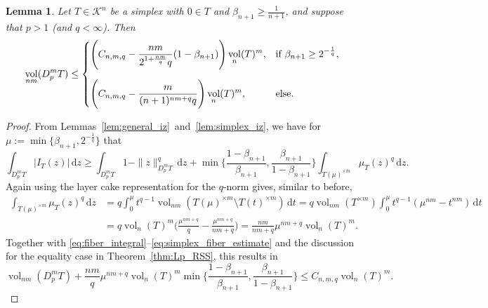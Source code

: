 \documentclass{amsart}
\newtheorem{lemma}[theorem]{Lemma}
\newcommand\CK{\mathcal{K}}
\newcommand{\dd}{\,\mathrm{d}}
\DeclareMathOperator{\vol}{vol}
\newcommand{\diff}[3]{D_{#1}^{#2} #3}
\newcommand{\interval}[4]{I_{#3} (#4)}
\newcommand{\simplexscale}[2]{#1(#2)}
\newcommand{\simplexscaling}[2]{\mu_{#1}(#2)}
\newcommand{\cartesian}[2]{#1^{\times #2}}
\begin{document}
\begin{lemma}\label{lem:simplex_stability}
Let $T \in \CK^n$ be a simplex with $0 \in T$ and $\beta_{n+1} \geq \frac{1}{n+1}$, and suppose that $p > 1$ (and $q < \infty$).
Then
\[
	\vol_{nm}(\diff{p}{m}{T})
	\leq \begin{cases}
		\displaystyle \Bigg( C_{n,m,q} - \frac{nm}{2^{1+\frac{nm}{q}} q} (1-\beta_{n+1}) \Bigg) \vol_n(T)^m,
			& \text{if } \beta_{n+1} \geq 2^{-\frac{1}{q}},
		\vspace{10pt}
		\\
		\displaystyle \Bigg( C_{n,m,q} - \frac{m}{(n+1)^{nm+q} q} \Bigg) \vol_n(T)^m,
			& \text{else}.
	\end{cases}
\]
\end{lemma}
\begin{proof}
From Lemmas~\ref{lem:general_iz}~and~\ref{lem:simplex_iz}, we have for $\mu := \min \{ \beta_{n+1}, 2^{-\frac{1}{q}} \}$ that
\begin{equation}\label{eq:simplex_fiber_estimate}
	\int_{\diff{p}{m}{T}} |\interval{p}{m}{T}{z}| \dd z
	\geq \int_{\diff{p}{m}{T}} 1 - \|z\|_{\diff{p}{m}{T}}^q \dd z
		+ \min \bigg\{ \frac{1-\beta_{n+1}}{\beta_{n+1}}, \frac{\beta_{n+1}}{1-\beta_{n+1}} \bigg\} \int_{\cartesian{\simplexscale{T}{\mu}}{m}} \simplexscaling{T}{z}^q \dd z.
\end{equation}
Again using the layer cake representation for the $q$-norm gives, similar to before,
\begin{align*}
	\int_{\cartesian{\simplexscale{T}{\mu}}{m}} \simplexscaling{T}{z}^q \dd z
	& = q \int_0^\mu t^{q-1} \vol_{nm}(\cartesian{\simplexscale{T}{\mu}}{m} \setminus \cartesian{\simplexscale{T}{t}}{m}) \dd t
	= q \vol_{nm}(\cartesian{T}{m}) \int_0^\mu t^{q-1} (\mu^{nm} - t^{nm}) \dd t
	\\
	& = q \vol_n(T)^m \bigg( \frac{\mu^{nm+q}}{q} - \frac{\mu^{nm+q}}{nm+q} \bigg)
    = \frac{nm}{nm+q} \mu^{nm+q} \vol_n(T)^m.
\end{align*}
Together with \eqref{eq:fiber_integral}--\eqref{eq:simplex_fiber_estimate} and the discussion for the equality case in Theorem~\ref{thm:Lp_RSS}, this results in
\[
	\vol_{nm}(\diff{p}{m}{T}) + \frac{nm}{q} \mu^{nm+q} \vol_n(T)^m \min \bigg\{ \frac{1-\beta_{n+1}}{\beta_{n+1}}, \frac{\beta_{n+1}}{1-\beta_{n+1}} \bigg\}
	\leq C_{n,m,q} \vol_n(T)^m.
\]


\end{proof}
\end{document}
